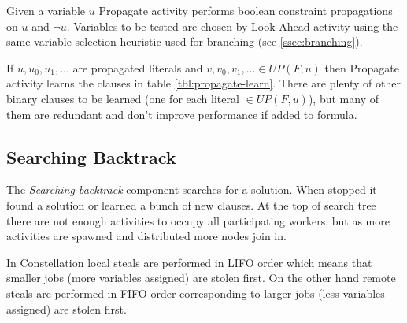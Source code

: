 Given a variable $u$ Propagate activity performs boolean constraint
propagations on $u$ and $\neg u$. Variables to be tested are chosen
by Look-Ahead activity using the same variable selection heuristic
used for branching (see \ref{ssec:branching}).

If $u, u_0, u_1, \ldots$ are propagated literals and $v, v_0, v_1,
\ldots \in UP(F, u)$ then Propagate activity learns the clauses in table
\ref{tbl:propagate-learn}. There are plenty of other binary clauses
to be learned (one for each literal $\in UP(F, u)$), but many of them
are redundant and don't improve performance if added to formula.

\begin{table}
  \centering
  \caption{Learned units and binaries by Propagate activity}
  \label{tbl:propagate-learn}
\end{table}



\subsection{Searching Backtrack}
\label{ssec:searching-tree}

The \emph{Searching backtrack} component searches for a solution.
When stopped it found a solution or learned a bunch of new clauses.
At the top of search tree there are not enough activities to occupy
all participating workers, but as more activities are spawned and
distributed more nodes join in.

In Constellation local steals are performed in LIFO order which means
that smaller jobs (more variables assigned) are stolen first. On
the other hand remote steals are performed in FIFO order corresponding
to larger jobs (less variables assigned) are stolen first.

